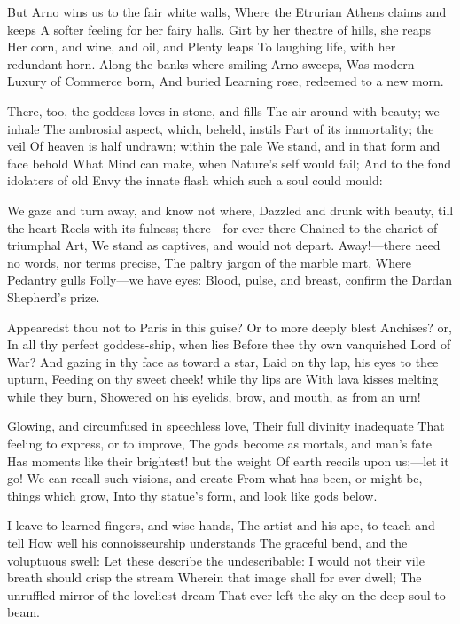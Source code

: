 \documentclass[10pt,twocolumn]{book}
\begin{document}
   But Arno wins us to the fair white walls,
   Where the Etrurian Athens claims and keeps
   A softer feeling for her fairy halls.
   Girt by her theatre of hills, she reaps
   Her corn, and wine, and oil, and Plenty leaps
   To laughing life, with her redundant horn.
   Along the banks where smiling Arno sweeps,
   Was modern Luxury of Commerce born,
And buried Learning rose, redeemed to a new morn.


   There, too, the goddess loves in stone, and fills
   The air around with beauty; we inhale
   The ambrosial aspect, which, beheld, instils
   Part of its immortality; the veil
   Of heaven is half undrawn; within the pale
   We stand, and in that form and face behold
   What Mind can make, when Nature's self would fail;
   And to the fond idolaters of old
Envy the innate flash which such a soul could mould:


   We gaze and turn away, and know not where,
   Dazzled and drunk with beauty, till the heart
   Reels with its fulness; there---for ever there\textemdash
   Chained to the chariot of triumphal Art,
   We stand as captives, and would not depart.
   Away!---there need no words, nor terms precise,
   The paltry jargon of the marble mart,
   Where Pedantry gulls Folly---we have eyes:
Blood, pulse, and breast, confirm the Dardan Shepherd's prize.


   Appearedst thou not to Paris in this guise?
   Or to more deeply blest Anchises? or,
   In all thy perfect goddess-ship, when lies
   Before thee thy own vanquished Lord of War?
   And gazing in thy face as toward a star,
   Laid on thy lap, his eyes to thee upturn,
   Feeding on thy sweet cheek! while thy lips are
   With lava kisses melting while they burn,
Showered on his eyelids, brow, and mouth, as from an urn!


   Glowing, and circumfused in speechless love,
   Their full divinity inadequate
   That feeling to express, or to improve,
   The gods become as mortals, and man's fate
   Has moments like their brightest! but the weight
   Of earth recoils upon us;---let it go!
   We can recall such visions, and create
   From what has been, or might be, things which grow,
Into thy statue's form, and look like gods below.


   I leave to learned fingers, and wise hands,
   The artist and his ape, to teach and tell
   How well his connoisseurship understands
   The graceful bend, and the voluptuous swell:
   Let these describe the undescribable:
   I would not their vile breath should crisp the stream
   Wherein that image shall for ever dwell;
   The unruffled mirror of the loveliest dream
That ever left the sky on the deep soul to beam.
\end{document}
